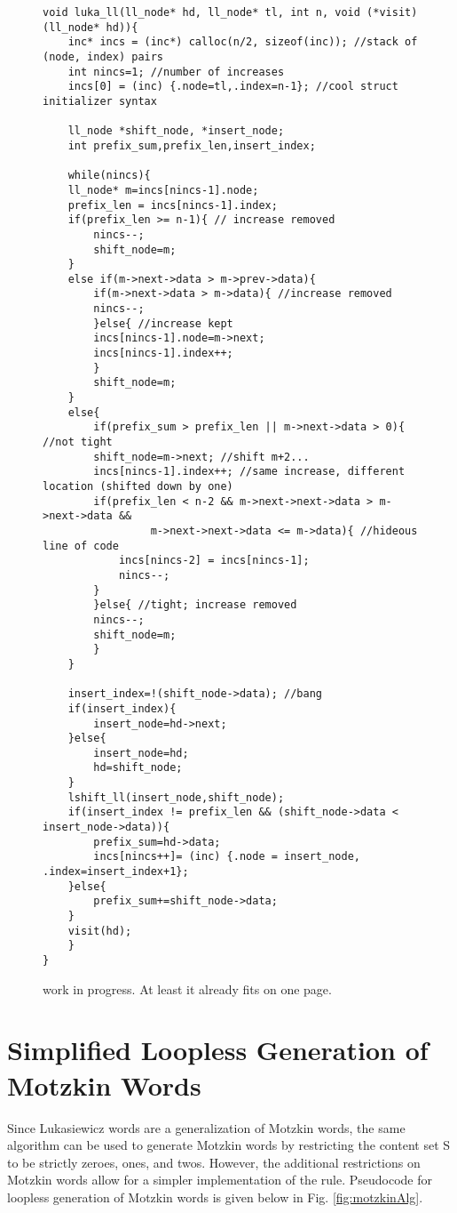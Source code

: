 


\begin{figure}[H]
\begin{Verbatim}
void luka_ll(ll_node* hd, ll_node* tl, int n, void (*visit)(ll_node* hd)){
    inc* incs = (inc*) calloc(n/2, sizeof(inc)); //stack of (node, index) pairs
    int nincs=1; //number of increases
    incs[0] = (inc) {.node=tl,.index=n-1}; //cool struct initializer syntax

    ll_node *shift_node, *insert_node;
    int prefix_sum,prefix_len,insert_index;

    while(nincs){
	ll_node* m=incs[nincs-1].node;
	prefix_len = incs[nincs-1].index;
	if(prefix_len >= n-1){ // increase removed
	    nincs--;
	    shift_node=m;
	}
	else if(m->next->data > m->prev->data){
	    if(m->next->data > m->data){ //increase removed
		nincs--;
	    }else{ //increase kept
		incs[nincs-1].node=m->next;
		incs[nincs-1].index++;
	    }
	    shift_node=m;
	}
	else{
	    if(prefix_sum > prefix_len || m->next->data > 0){ //not tight
		shift_node=m->next; //shift m+2...
		incs[nincs-1].index++; //same increase, different location (shifted down by one)
		if(prefix_len < n-2 && m->next->next->data > m->next->data && 
                 m->next->next->data <= m->data){ //hideous line of code
		    incs[nincs-2] = incs[nincs-1];
		    nincs--;
		}
	    }else{ //tight; increase removed
		nincs--;	
		shift_node=m;
	    }
	}

	insert_index=!(shift_node->data); //bang
	if(insert_index){
	    insert_node=hd->next;
	}else{
	    insert_node=hd;
	    hd=shift_node;
	}
	lshift_ll(insert_node,shift_node);
	if(insert_index != prefix_len && (shift_node->data < insert_node->data)){
	    prefix_sum=hd->data;
	    incs[nincs++]= (inc) {.node = insert_node, .index=insert_index+1};
	}else{
	    prefix_sum+=shift_node->data;
	}
	visit(hd);
    }
}
\end{Verbatim}

\caption{work in progress. At least it already fits on one page.}
\label{fig:lukaAlg}
\end{figure}


\section{Simplified Loopless Generation of Motzkin Words}
Since Lukasiewicz words are a generalization of Motzkin words, the same algorithm can be used to generate Motzkin words by restricting the content set S to be strictly zeroes, ones, and twos.  However, the additional restrictions on Motzkin words allow for a simpler implementation of the rule.   Pseudocode for loopless generation of Motzkin words is given below in Fig. \ref{fig:motzkinAlg}. 


